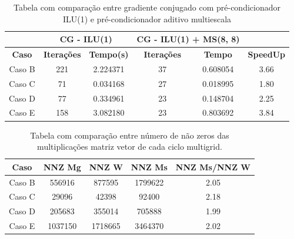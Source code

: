 \begin{table}[]

\caption{Tabela com comparação entre gradiente conjugado com pré-condicionador ILU(1) e pré-condicionador aditivo multiescala} \label{tab:comparacaoILU}

\begin{tabular}{c|c|c|c|c|c}
\cline{2-5}
                                    & \multicolumn{2}{c|}{\textbf{CG - ILU(1)}} & \multicolumn{2}{c|}{\textbf{CG - ILU(1) + MS(8, 8)}} &                                       \\ \hline
\multicolumn{1}{|c|}{\textbf{Caso}} & \textbf{Iterações}   & \textbf{Tempo(s)}  & \textbf{Iterações}          & \textbf{Tempo}         & \multicolumn{1}{c|}{\textbf{SpeedUp}} \\ \hline
\multicolumn{1}{|c|}{Caso B}        & 221                  & 2.224371           & 37                          & 0.608054               & \multicolumn{1}{c|}{3.66}             \\ \hline
\multicolumn{1}{|c|}{Caso C}        & 71                   & 0.034168           & 27                          & 0.018995               & \multicolumn{1}{c|}{1.80}             \\ \hline
\multicolumn{1}{|c|}{Caso D}        & 77                   & 0.334961           & 23                          & 0.148704               & \multicolumn{1}{c|}{2.25}             \\ \hline
\multicolumn{1}{|c|}{Caso E}        & 158                  & 3.082180           & 23                          & 0.803692               & \multicolumn{1}{c|}{3.84}             \\ \hline
\end{tabular}
\end{table}


\begin{table}[]
\centering
\caption{Tabela com comparação entre número de não zeros das multiplicações matriz vetor de cada ciclo multigrid.} \label{tab:comparacaoMsxMgProlongamento}
\begin{tabular}{|c|c|c|c|c|}
\hline
\textbf{Caso} & \textbf{NNZ Mg} & \textbf{NNZ W} & \textbf{NNZ Ms} & \textbf{NNZ Ms/NNZ W} \\ \hline
Caso B        & 556916                       & 877595                   & 1799622                  & 2.05                                     \\ \hline
Caso C        & 29096                        & 42398                    & 92400                    & 2.18                                     \\ \hline
Caso D        & 205683                       & 355014                   & 705888                   & 1.99                                     \\ \hline
Caso E        & 1037150                      & 1718665                  & 3464370                  & 2.02                                     \\ \hline
\end{tabular}
\end{table}


